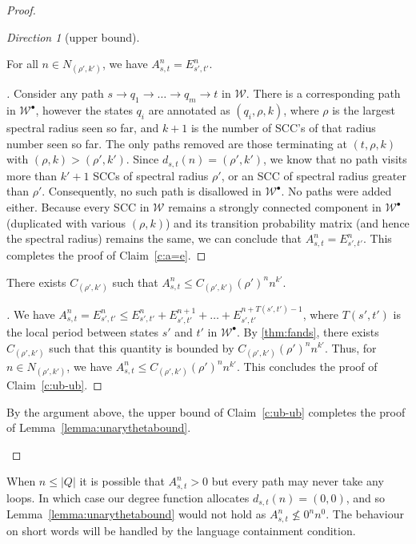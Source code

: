 \documentclass{lmcs}
\theoremstyle{plain}
\theoremstyle{definition}
\theoremstyle{remark}
\newtheorem{dir}{Direction}
\newenvironment{subproof}[1][\proofname]{\renewcommand{\qedsymbol}{{$\blacksquare$}}\begin{proof}[#1]}{\end{proof}}
\newcommand\period{T}
\newcommand\dgf{d}
\newcommand\wa{\mathcal{W}}
\begin{document}
\begin{proof}
\begin{dir}[upper bound]
\begin{clm}
\label{c:a=e}
For all $n \in N_{(\rho',k')}$, we have $A_{s,t}^n = E_{s',t'}^n$.
\end{clm}

\begin{subproof}
Consider any path $s \to q_1\to\dots \to q_m \to t$ in $\wa$. There is a corresponding path  in $\wa^\bullet$,
however the states $q_i$ are annotated as $(q_i,\rho,k)$, where $\rho$ is the largest spectral radius
seen so far, and $k+1$ is the number of SCC's of that radius number seen so far.
The only paths removed are those terminating at $(t,\rho,k)$ with $(\rho, k) > (\rho',k')$. Since $\dgf_{s,t}(n) = (\rho',k')$, we know that no path visits more than $k'+1$ SCCs of spectral radius $\rho'$, or an SCC of spectral radius greater than $\rho'$. Consequently,  no such path is disallowed in $\wa^\bullet$. No paths were added either.
Because every SCC in $\wa$ remains a strongly connected component in $\wa^\bullet$ (duplicated with various $(\rho, k)$)
and its transition probability matrix (and hence the spectral radius) remains the same, we can conclude that
$A_{s,t}^n = E_{s',t'}^n$.
This completes the proof of Claim~\ref{c:a=e}.
\end{subproof}

\begin{clm}
\label{c:ub-ub}
There exists $C_{(\rho',k')}$ such that  $A_{s,t}^n \le C_{(\rho',k')} (\rho')^n n^{k'}$.
\end{clm}

\begin{subproof}
We have  $A_{s,t}^n = E_{s',t'}^n \le E_{s',t'}^n + E_{s',t'}^{n+1} + \dots + E_{s',t'}^{n+\period(s',t')-1}$, where $\period(s',t')$ is the local period between states $s'$ and $t'$ in $\wa^\bullet$.
By \cref{thm:fands}, there exists $C_{(\rho',k')}$ such that this quantity is bounded by $C_{(\rho',k')} (\rho')^n n^{k'}$.
Thus, for $n \in N_{(\rho',k')}$, we have $A_{s,t}^n \le C_{(\rho',k')} (\rho')^n n^{k'}$.
This concludes the proof of Claim~\ref{c:ub-ub}.
\end{subproof}

\noindent
By the argument above, the upper bound of Claim~\ref{c:ub-ub}
completes the proof of Lemma~\ref{lemma:unarythetabound}.\qedhere
\end{dir}
\end{proof}

\pagebreak

\begin{rem}\label{rem:whynowork}
When $n \le|Q|$ it is possible that $A^n_{s,t} > 0$ but every path may never take any loops. In which case our degree function allocates $d_{s,t}(n) = (0,0)$, and so Lemma~\ref{lemma:unarythetabound} would not hold as $A^n_{s,t} \not\le 0^nn^0$. The behaviour on short words will be handled by the language containment condition.
\end{rem}
\end{document}
